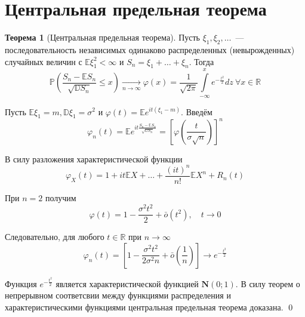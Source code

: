 \documentclass[oneside,final,14pt]{extreport}
\renewenvironment{proof}{{\bfseries Доказательство.}}{\qed}
\theoremstyle{plain}
\theoremstyle{definition}
\theoremstyle{named}
\newtheorem*{namedthm}{Теорема}
\begin{document}
\section{Центральная предельная теорема}
\begin{namedthm}[Центральная предельная теорема]
    Пусть $\xi_{1}, \xi_{2}, \ldots$~--- последовательность независимых одинаково распределенных (невырожденных) случайных величин с $\mathbb{E} \xi_{1}^{2}<\infty$ и $S_{n}=\xi_{1}+\ldots+\xi_{n}$. Тогда
    \begin{equation*}
        \mathbb{P}\left(\frac{S_{n}-\mathbb{E} S_{n}}{\sqrt{\mathbb{D} S_{n}}} \leqslant x\right)
        \xrightarrow[n \rightarrow \infty]{}
        \varphi(x) = \frac{1}{\sqrt{2 \pi}} \int\limits_{-\infty}^{x} e^{-\frac{z^{2}}{2}} dz~ \forall x \in \mathbb{R}
    \end{equation*}
\end{namedthm}
\begin{proof}
Пусть $\mathbb{E} \xi_{1}=m, \mathbb{D} \xi_{1}=\sigma^{2}$ и $\varphi(t)=\mathbb{E} e^{i t\left(\xi_{1}-m\right)}$. Введём
\begin{equation*}
    \varphi_{n}(t)=\mathbb{E} e^{i t \frac{S_{n}-\mathbb{E} S_{n}}{\sqrt{\mathbb{D} S_{n}}}} = 
    \left[\varphi\left(\frac{t}{\sigma \sqrt{n}}\right)\right]^{n}
\end{equation*}

В силу разложения характеристической функции
\begin{equation*}
    \varphi_{X}(t)=1+i t \mathbb{E} X+\ldots+\frac{(i t)^{n}}{n !} \mathbb{E} X^{n}+R_{n}(t)
\end{equation*}

При $n=2$ получим 
\begin{equation*}
    \varphi(t)=1-\frac{\sigma^{2} t^{2}}{2}+\bar{o}\left(t^{2}\right), \quad t \rightarrow 0
\end{equation*}

Следовательно, для любого $t \in \mathbb{R}$ при $n \rightarrow \infty$
\begin{equation*}
    \varphi_{n}(t)=\left[1-\frac{\sigma^{2} t^{2}}{2 \sigma^{2} n}+\bar{o}\left(\frac{1}{n}\right)\right] \rightarrow e^{-\frac{t^{2}}{2}}
\end{equation*}

Функция $e^{-\frac{t^{2}}{2}}$ является характеристической функцией $\mathbf{N}(0;1)$. В силу теорем о непрерывном соответсвии между функциями распределения и характеристическими функциями центральная предельная теорема доказана.
\end{proof}
\end{document}
